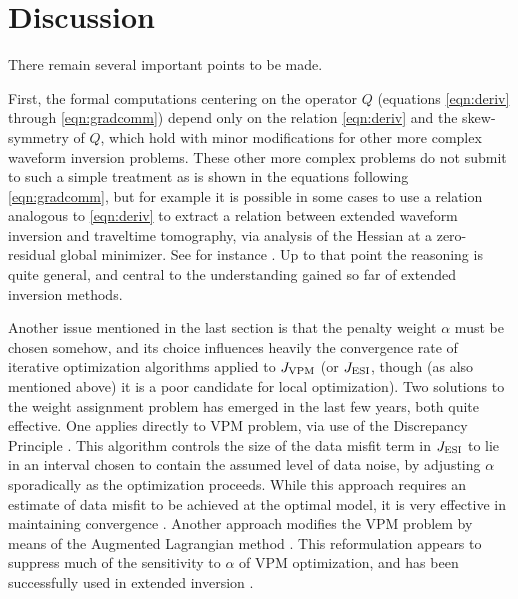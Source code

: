 \section{Discussion}
There remain several important points to be made. 

First, the formal computations centering on the operator $Q$
(equations \ref{eqn:deriv} through \ref{eqn:gradcomm}) depend only on
the relation \ref{eqn:deriv} and the skew-symmetry of $Q$, which hold
with minor modifications for other more complex waveform inversion
problems. These other more complex problems do not submit to such a
simple treatment as is shown in the equations following
\ref{eqn:gradcomm}, but for example it is possible in some cases to
use a relation analogous to \ref{eqn:deriv} to extract a relation between extended waveform inversion and traveltime tomography, via analysis of the Hessian at a zero-residual global minimizer. See for instance \cite{tenKroode:IPTA14,Symes:IPTA14,Symes:Madrid}. Up to that point the reasoning is quite general, and central to the understanding gained so far of extended inversion methods. 

Another issue mentioned in the last section is that the penalty weight
$\alpha$ must be chosen somehow, and its choice influences heavily the
convergence rate of iterative optimization algorithms applied to $J_{
  \rm VPM}$ (or $J_{\rm ESI}$, though (as also mentioned above) it is a
poor candidate for local optimization). Two solutions to the weight
assignment problem has emerged in the last few years, both quite effective. One applies
directly to VPM problem, via use of the Discrepancy Principle
\cite[]{Morozov:84}. This algorithm controls the size of the data
misfit term in $J_{\rm ESI}$ to lie in an interval chosen to contain
the assumed level of data noise, by adjusting $\alpha$ sporadically as
the optimization proceeds. While this approach requires an estimate of
data misfit to be achieved at the optimal model, it is very effective
in maintaining convergence \cite[]{FuSymes2017discrepancy}. Another
approach modifies the VPM problem by means of the Augmented Lagrangian
method \cite[]{NocedalWright}. This reformulation appears to suppress
much of the sensitivity to $\alpha$ of VPM optimization, and has been
successfully used in extended inversion \cite[]{Aghamiry:19}.

